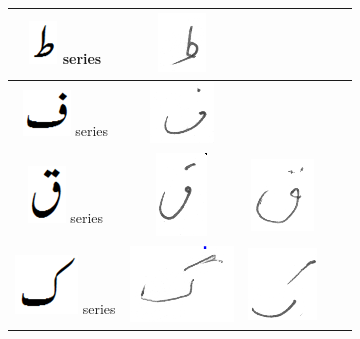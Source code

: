 \begin{table}[h]
\begin{tabular}{@{}ccccc@{}}
\hline
\includegraphics[scale=0.15]{tuay_orig} series & \includegraphics[scale=0.15]{60} &  & & \\
\hline
\includegraphics[scale=0.25]{fay_orig} series & \includegraphics[scale=0.20]{61} & & & \\
\hline
\includegraphics[scale=0.20]{qaaf_orig} series & \includegraphics[scale=0.15]{62} & 
\includegraphics[scale=0.15]{63} &  & \\
\hline
\includegraphics[scale=0.15]{kaaf_orig} series & \includegraphics[scale=0.15]{64} & \includegraphics[scale=0.15]{65}  & 

\end{tabular}
\end{table}
